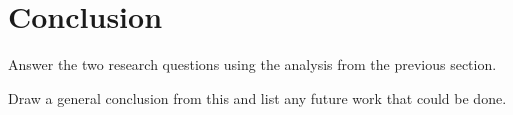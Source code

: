 \section{Conclusion}

Answer the two research questions using the analysis from the previous section.

Draw a general conclusion from this and list any future work that could be done.

